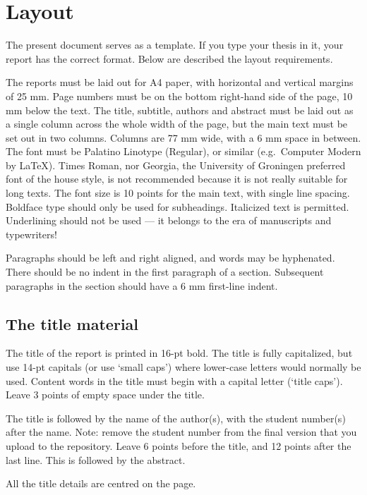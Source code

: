 
\section{Layout}\label{sec:layout}
The present document serves as a template.
If you type your thesis in it, your report has the correct format.
Below are described the layout requirements.

The reports must be laid out for A4 paper, with horizontal and vertical margins of 25 mm.
Page numbers must be on the bottom right-hand side of the page, 10 mm below the text.
The title, subtitle, authors and abstract must be laid out as a single column across the whole width of the page, but the main text must be set out in two columns.
Columns are 77 mm wide, with a 6 mm space in between.
The font must be Palatino Linotype (Regular), or similar (e.g.\ Computer Modern by \LaTeX).
Times Roman, nor Georgia, the University of Groningen preferred font of the house style, is not recommended because it is not really suitable for long texts.
The font size is 10 points for the main text, with single line spacing.
Boldface type should only be used for subheadings.
Italicized text is permitted.
Underlining should not be used –-- it belongs to the era of manuscripts and typewriters!

Paragraphs should be left and right aligned, and words may be hyphenated.
There should be no indent in the first paragraph of a section.
Subsequent paragraphs in the section should have a 6 mm first-line indent.

\subsection{The title material}\label{sec:_title_material}
The title of the report is printed in 16-pt bold.
The title is fully capitalized, but use 14-pt capitals (or use `small caps') where lower-case letters would normally be used.
Content words in the title must begin with a capital letter (`title caps').
Leave 3 points of empty space under the title.

The title is followed by the name of the author(s), with the student number(s) after the name.
Note: remove the student number from the final version that you upload to the repository.
Leave 6 points before the title, and 12 points after the last line.
This is followed by the abstract.

All the title details are centred on the page.

